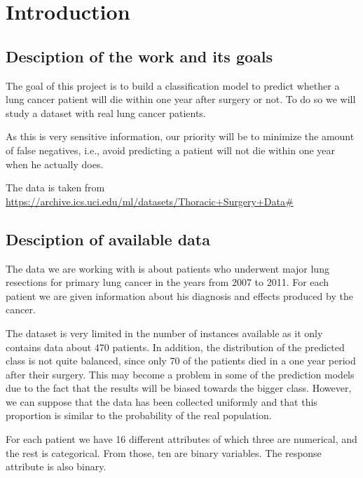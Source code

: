 \section{Introduction}

\subsection{Desciption of the work and its goals}

The goal of this project is to build a classification model to predict whether
a lung cancer patient will die within one year after surgery or not. To do so
we will study a dataset with real lung cancer patients.

As this is very sensitive information, our priority will be to minimize the
amount of false negatives, i.e., avoid predicting a patient will not die within
one year when he actually does.

The data is taken from
\url{https://archive.ics.uci.edu/ml/datasets/Thoracic+Surgery+Data#}
\cite{zieba2013boosted}

\subsection{Desciption of available data}

The data we are working with is about patients who underwent major lung
resections for primary lung cancer in the years from 2007 to 2011. For each
patient we are given information about his diagnosis and effects produced
by the cancer.

The dataset is very limited in the number of instances available as it only contains
data about 470 patients. In addition, the distribution of the predicted class is not quite 
balanced,
since only 70 of the patients died in a one year period after their surgery. This may 
become a problem in some of the prediction models due to the fact that the results 
will be biased towards the bigger class. However, we can suppose that the data has been
collected uniformly and that this proportion is similar to the probability of the real population.

For each patient we have 16 different attributes of which three are numerical, and
the rest is categorical. From those, ten are binary variables. The response attribute is
also binary.

